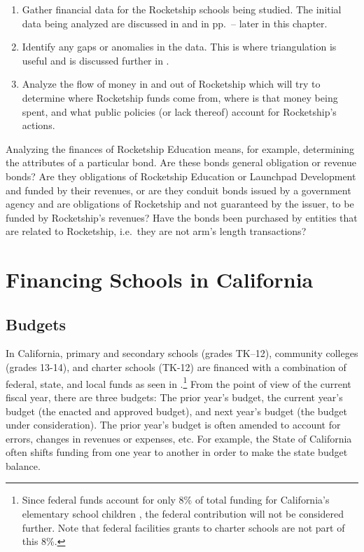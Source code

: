 \begin{enumerate}
  \item Gather financial data for the Rocketship schools being studied. The initial data being analyzed are discussed in  and  in pp.~\pageref{sec:financing-ca-overview}–\pageref{sec:charter-school-financing} later in this chapter.
  \item Identify any gaps or anomalies in the data. This is where triangulation is useful and is discussed further in  . 
  \item Analyze the flow of money in and out of Rocketship which will try to determine where Rocketship funds come from, where is that money being spent, and what public policies (or lack thereof) account for Rocketship's actions.
\end{enumerate}

Analyzing the finances of Rocketship Education means, for example, determining the attributes of a particular bond. Are these bonds general obligation or revenue bonds? Are they obligations of Rocketship Education or Launchpad Development and funded by their revenues, or are they conduit bonds issued by a government agency and are obligations of Rocketship and not guaranteed by the issuer, to be funded by Rocketship's revenues? Have the bonds been purchased by entities that are related to Rocketship, i.e.~they are not arm's length transactions?

\section{Financing Schools in California}\label{sec:financing-ca-overview}\indent%

\subsection{Budgets}
In California, primary and secondary schools (grades TK–12), community colleges (grades 13-14), and charter schools (TK-12) are financed with a combination of federal, state, and local funds as seen in .\footnote{Since federal funds account for only 8\% of total funding for California's elementary school children \parencite{LAO2021}, the federal contribution will not be considered further. Note that federal facilities grants to charter schools are not part of this 8\%.} From the point of view of the current fiscal year, there are three budgets: The prior year's budget, the current year's budget (the enacted and approved budget), and next year's budget (the budget under consideration). The prior year's budget is often amended to account for errors, changes in revenues or expenses, etc. For example, the State of California often shifts funding from one year to another in order to make the state budget balance.

